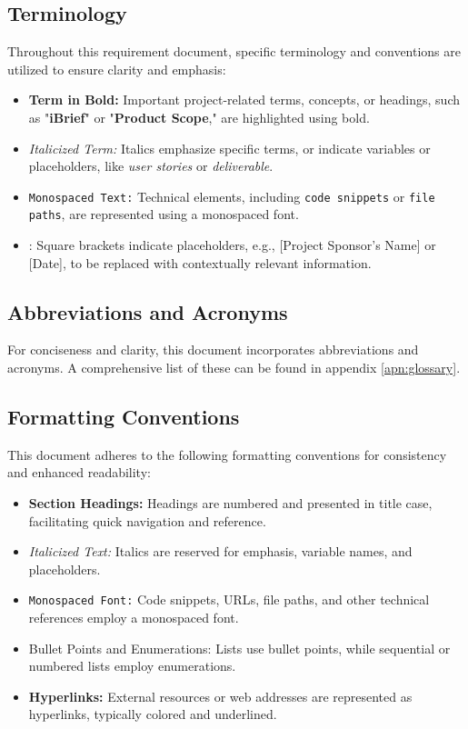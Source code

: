 \subsection{Terminology}
Throughout this requirement document, specific terminology and conventions are utilized to ensure clarity and emphasis:
    \begin{itemize}
        \item \textbf{Term in Bold:} Important project-related terms, concepts, or headings, such as "\textbf{iBrief}" or "\textbf{Product Scope}," are highlighted using bold.
        
        \item \textit{Italicized Term:} Italics emphasize specific terms, or indicate variables or placeholders, like \textit{user stories} or \textit{deliverable}.
        
        \item \texttt{Monospaced Text:} Technical elements, including \texttt{code snippets} or \texttt{file paths}, are represented using a monospaced font.
        
        \item {}: Square brackets indicate placeholders, e.g., [Project Sponsor's Name] or [Date], to be replaced with contextually relevant information.
    \end{itemize}

\subsection{Abbreviations and Acronyms}
For conciseness and clarity, this document incorporates abbreviations and acronyms. A comprehensive list of these can be found in appendix \ref{apn:glossary}.

\subsection{Formatting Conventions}
This document adheres to the following formatting conventions for consistency and enhanced readability:

    \begin{itemize}
        \item \textbf{Section Headings:} Headings are numbered and presented in title case, facilitating quick navigation and reference.
        
        \item \textit{Italicized Text:} Italics are reserved for emphasis, variable names, and placeholders.
        
        \item \texttt{Monospaced Font:} Code snippets, \gls{URL}s, file paths, and other technical references employ a monospaced font.
        
        \item Bullet Points and Enumerations: Lists use bullet points, while sequential or numbered lists employ enumerations.
        
        \item \textbf{Hyperlinks:} External resources or web addresses are represented as hyperlinks, typically colored and underlined.
    \end{itemize}

